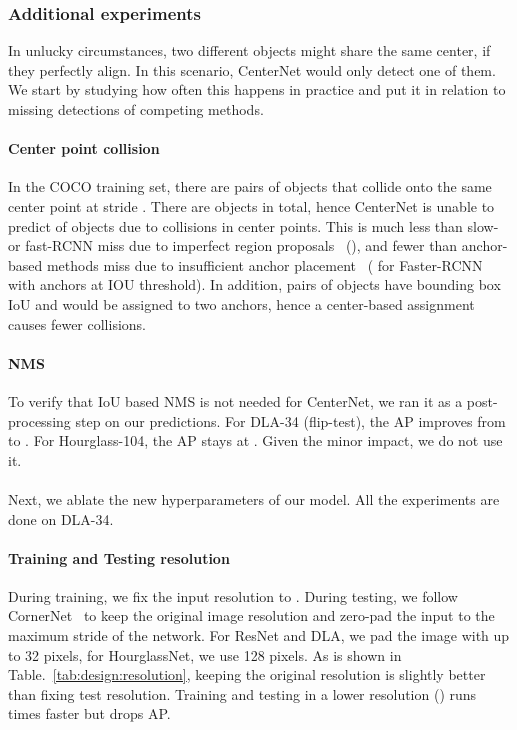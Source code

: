 \documentclass[10pt,twocolumn,letterpaper]{article}
\begin{document}
\subsubsection{Additional experiments}

In unlucky circumstances, two different objects might share the same center, if they perfectly align.
In this scenario, CenterNet would only detect one of them.
We start by studying how often this happens in practice and put it in relation to missing detections of competing methods.

\paragraph{Center point collision}
In the COCO training set, there are  pairs of objects that collide onto the same center point at stride .
There are  objects in total, hence CenterNet is unable to predict  of objects due to collisions in center points.
This is much less than slow- or fast-RCNN miss due to imperfect region proposals~\cite{uijlings2013selective} (), and fewer than anchor-based methods miss due to insufficient anchor placement~\cite{ren2015faster} ( for Faster-RCNN with  anchors at  IOU threshold).
In addition,  pairs of objects have bounding box IoU  and would be assigned to two anchors, hence a center-based assignment causes fewer collisions.


\paragraph{NMS}
To verify that IoU based NMS is not needed for CenterNet, 
we ran it as a post-processing step on our predictions.
For DLA-34 (flip-test), the AP improves from  to . 
For Hourglass-104, the AP stays at .
Given the minor impact, we do not use it.
\\ \\
Next, we ablate the new hyperparameters of our model.
All the experiments are done on DLA-34.

\paragraph{Training and Testing resolution}
During training, we fix the input resolution to .
During testing, we follow CornerNet~\cite{Law_2018_ECCV} to keep the original image resolution and zero-pad the input to the maximum stride of the network.
For ResNet and DLA, we pad the image with up to 32 pixels, for HourglassNet, we use 128 pixels.
As is shown in Table.~\ref{tab:design:resolution}, keeping the original resolution is slightly better than fixing test resolution.
Training and testing in a lower resolution () runs  times faster but drops AP.
\end{document}

